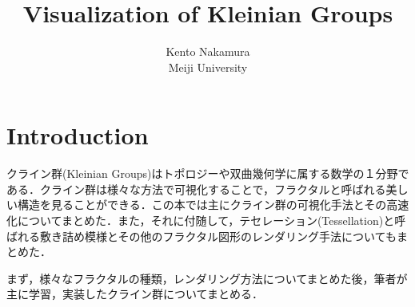 \documentclass[dvipdfmx]{jarticle}
\title{ Visualization of Kleinian Groups }
\author{ Kento Nakamura\\
Meiji University\\
}
\date{}
\begin{document}
\maketitle

\tableofcontents

\section{Introduction}
クライン群(Kleinian Groups)はトポロジーや双曲幾何学に属する数学の１分野である．クライン群は様々な方法で可視化することで，フラクタルと呼ばれる美しい構造を見ることができる．この本では主にクライン群の可視化手法とその高速化についてまとめた．また，それに付随して，テセレーション(Tessellation)と呼ばれる敷き詰め模様とその他のフラクタル図形のレンダリング手法についてもまとめた．

まず，様々なフラクタルの種類，レンダリング方法についてまとめた後，筆者が主に学習，実装したクライン群についてまとめる．




\end{document}
